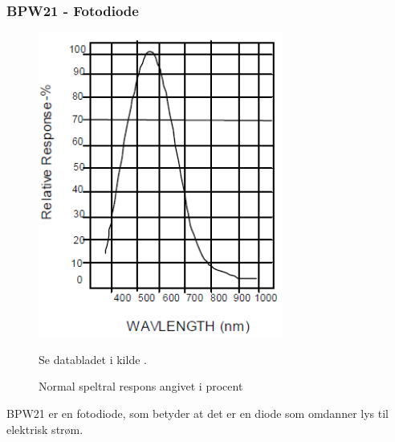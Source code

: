 \subsubsection{BPW21 - Fotodiode}
\begin{figure}[H]
	\centering
    \includegraphics[height=10cm]{figures/komponenter/photosensor}
	\caption{Normal speltral respons angivet i procent}
	Se databladet i kilde \cite{kompPhoto}.
\end{figure}
BPW21 er en fotodiode, som betyder at det er en diode som omdanner lys til elektrisk strøm. 


